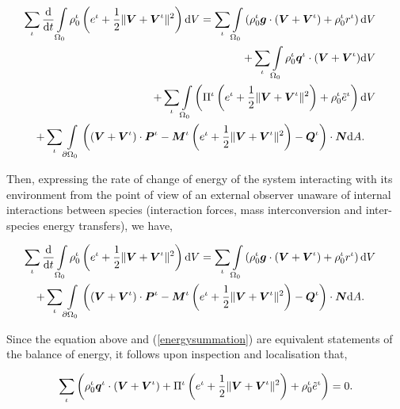 \begin{eqnarray}
\sum\limits_{\iota}\frac{\mathrm{d}}{\mathrm{d}t}
\int\limits_{\Omega_0}\rho_0^\iota \left ( e^\iota + \frac{1}{2}
\Vert\mbox{\boldmath$ V$}+\mbox{\boldmath$ V$}^\iota\Vert^2 \right ) \mathrm{d}V =
\sum\limits_{\iota}\int\limits_{\Omega_0} \left(\rho_0^\iota\mbox{\boldmath$ g$}
\cdot\left(\mbox{\boldmath$ V$}+\mbox{\boldmath$ V$}^\iota\right) + \rho_0^\iota r^\iota
\right)\mathrm{d}V& &\nonumber\\ +
\sum\limits_{\iota}\int\limits_{\Omega_0}
\rho_0^\iota\mbox{\boldmath$ q$}^\iota\cdot(\mbox{\boldmath$ V$}+\mbox{\boldmath$ V$}^\iota)\mathrm{d}V& &\nonumber\\ +
\sum\limits_{\iota}\int\limits_{\Omega_0} \left(\Pi^\iota\left(e^\iota
+ \frac{1}{2}\Vert\mbox{\boldmath$ V$}+\mbox{\boldmath$ V$}^\iota\Vert^2\right) +
\rho^\iota_0\tilde{e}^\iota\right)\mathrm{d}V \label{energysummation}&
& \\ +\sum\limits_{\iota}\int\limits_{\partial
  \Omega_0}\left(\left(\mbox{\boldmath$ V$}+\mbox{\boldmath$ V$}^\iota\right)\cdot\mbox{\boldmath$ P$}^\iota -
\mbox{\boldmath$ M$}^\iota\left(e^\iota +\frac{1}{2} \Vert\mbox{\boldmath$ V$}+\mbox{\boldmath$ V$}^\iota\Vert^2\right) -
\mbox{\boldmath$ Q$}^\iota\right)\cdot\mbox{\boldmath$ N$}\mathrm{d}A.\quad& & \nonumber
\end{eqnarray}

Then, expressing the rate of change of energy of the system
interacting with its environment from the point of view of an external
observer unaware of internal interactions between species (interaction
forces, mass interconversion and inter-species energy transfers), we
have,

\begin{eqnarray}
\sum\limits_{\iota}\frac{\mathrm{d}}{\mathrm{d}t}
\int\limits_{\Omega_0}\rho_0^\iota \left ( e^\iota + \frac{1}{2}
\Vert\mbox{\boldmath$ V$}+\mbox{\boldmath$ V$}^\iota\Vert^2 \right ) \mathrm{d}V =
\sum\limits_{\iota}\int\limits_{\Omega_0} \left(\rho_0^\iota\mbox{\boldmath$ g$}
\cdot\left(\mbox{\boldmath$ V$}+\mbox{\boldmath$ V$}^\iota\right) + \rho_0^\iota r^\iota
\right)\mathrm{d}V &
&\nonumber\\ +\sum\limits_{\iota}\int\limits_{\partial
  \Omega_0}\left(\left(\mbox{\boldmath$ V$}+\mbox{\boldmath$ V$}^\iota\right)\cdot\mbox{\boldmath$ P$}^\iota -
\mbox{\boldmath$ M$}^\iota\left(e^\iota +\frac{1}{2} \Vert\mbox{\boldmath$ V$}+\mbox{\boldmath$ V$}^\iota\Vert^2\right) -
\mbox{\boldmath$ Q$}^\iota\right)\cdot\mbox{\boldmath$ N$}\mathrm{d}A.\quad\nonumber& &
\end{eqnarray}

Since the equation above and (\ref{energysummation}) are equivalent
statements of the balance of energy, it follows upon inspection and
localisation that,

\begin{eqnarray}
\sum\limits_{\iota}\left(\rho_0^\iota\mbox{\boldmath$ q$}^\iota\cdot(\mbox{\boldmath$ V$}+\mbox{\boldmath$ V$}^\iota)
+ \Pi^\iota\left(e^\iota +
\frac{1}{2}\Vert\mbox{\boldmath$ V$}+\mbox{\boldmath$ V$}^\iota\Vert^2\right) +
\rho^\iota_0\tilde{e}^\iota\right) =
0. \label{energysummationresult}
\end{eqnarray}

